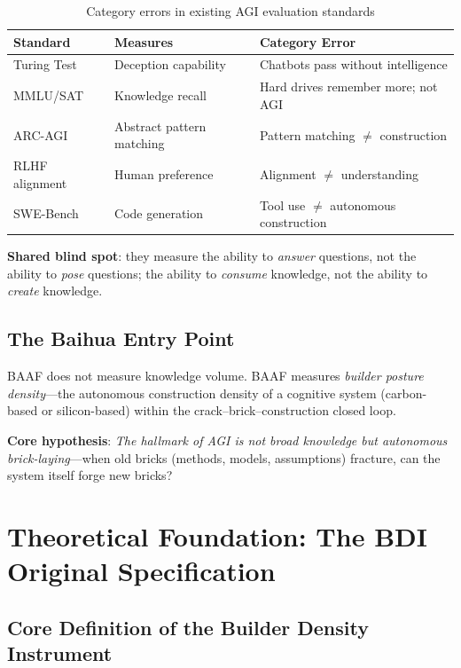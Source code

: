 \documentclass[11pt,a4paper]{article}
\theoremstyle{definition}
\theoremstyle{plain}
\newcommand{\BDI}{\textsc{BDI}}
\newcommand{\BAAF}{\textsc{BAAF}}
\begin{document}
\begin{table}[htbp]
\centering
\caption{Category errors in existing AGI evaluation standards}
\label{tab:benchmarks}
\begin{tabular}{@{}lll@{}}
\toprule
\textbf{Standard} & \textbf{Measures} & \textbf{Category Error} \\
\midrule
Turing Test & Deception capability & Chatbots pass without intelligence \\
MMLU/SAT & Knowledge recall & Hard drives remember more; not AGI \\
ARC-AGI & Abstract pattern matching & Pattern matching $\neq$ construction \\
RLHF alignment & Human preference & Alignment $\neq$ understanding \\
SWE-Bench & Code generation & Tool use $\neq$ autonomous construction \\
\bottomrule
\end{tabular}
\end{table}

\textbf{Shared blind spot}: they measure the ability to \textit{answer} questions, not the ability to \textit{pose} questions; the ability to \textit{consume} knowledge, not the ability to \textit{create} knowledge.

\subsection{The Baihua Entry Point}

\BAAF{} does not measure knowledge volume. \BAAF{} measures \textit{builder posture density}---the autonomous construction density of a cognitive system (carbon-based or silicon-based) within the crack--brick--construction closed loop.

\textbf{Core hypothesis}: \textit{The hallmark of AGI is not broad knowledge but autonomous brick-laying}---when old bricks (methods, models, assumptions) fracture, can the system itself forge new bricks?

\section{Theoretical Foundation: The \BDI{} Original Specification}
\label{sec:bdi-spec}

\subsection{Core Definition of the Builder Density Instrument}
\end{document}
